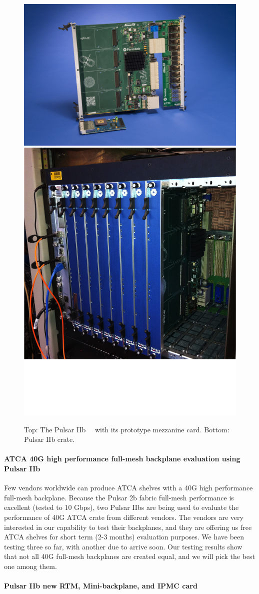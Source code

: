 \begin{figure}[ht!]
\centering
\includegraphics[width=0.8\columnwidth]{Plots/Pulsar2b-photo-compressed}
\includegraphics[width=0.2\columnwidth]{Plots/PuslarIIb-crate}
\caption{Top: The Pulsar IIb~\cite{bib:PulsarII}~\cite{bib:PulsarII-weblink} with its prototype mezzanine card.
Bottom: Pulsar IIb crate.}
\label{fig:ProcBlade}
\end{figure}


\paragraph{ATCA 40G high performance full-mesh backplane evaluation using Pulsar IIb}

Few vendors worldwide can produce ATCA shelves with a 40G high performance full-mesh backplane.
Because the Pulsar 2b fabric full-mesh performance is excellent (tested to 10 Gbps), two Pulsar IIbs are being used to evaluate the
performance of 40G ATCA crate from different vendors. The vendors are very interested in our capability to test their backplanes, and they are offering us free ATCA shelves for short term (2-3 months) evaluation purposes.  We have been testing three so far, with another due to arrive soon. Our testing results show that not all 40G full-mesh backplanes are created equal, and we will pick the best one among them.


\paragraph{Pulsar IIb new RTM, Mini-backplane, and IPMC card}

